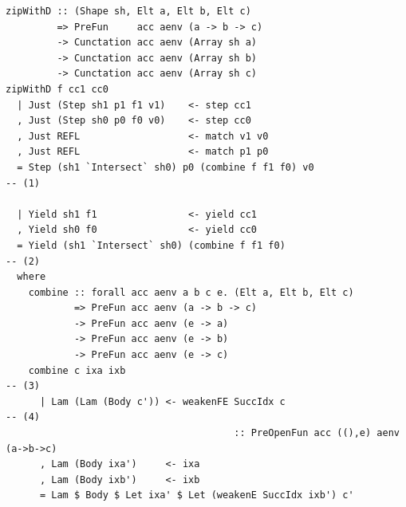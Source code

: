 \begin{lstlisting}[style=haskell_float
    ,name=zipWithD
    ,label=lst:zipWithD
    ,caption={Smart constructor for fusing the \code{zipWith} operation}]
zipWithD :: (Shape sh, Elt a, Elt b, Elt c)
         => PreFun     acc aenv (a -> b -> c)
         -> Cunctation acc aenv (Array sh a)
         -> Cunctation acc aenv (Array sh b)
         -> Cunctation acc aenv (Array sh c)
zipWithD f cc1 cc0
  | Just (Step sh1 p1 f1 v1)    <- step cc1
  , Just (Step sh0 p0 f0 v0)    <- step cc0
  , Just REFL                   <- match v1 v0
  , Just REFL                   <- match p1 p0
  = Step (sh1 `Intersect` sh0) p0 (combine f f1 f0) v0                                 -- (1)

  | Yield sh1 f1                <- yield cc1
  , Yield sh0 f0                <- yield cc0
  = Yield (sh1 `Intersect` sh0) (combine f f1 f0)                                      -- (2)
  where
    combine :: forall acc aenv a b c e. (Elt a, Elt b, Elt c)
            => PreFun acc aenv (a -> b -> c)
            -> PreFun acc aenv (e -> a)
            -> PreFun acc aenv (e -> b)
            -> PreFun acc aenv (e -> c)
    combine c ixa ixb                                                                  -- (3)
      | Lam (Lam (Body c')) <- weakenFE SuccIdx c                                      -- (4)
                                        :: PreOpenFun acc ((),e) aenv (a->b->c)
      , Lam (Body ixa')     <- ixa
      , Lam (Body ixb')     <- ixb
      = Lam $ Body $ Let ixa' $ Let (weakenE SuccIdx ixb') c'
\end{lstlisting}

